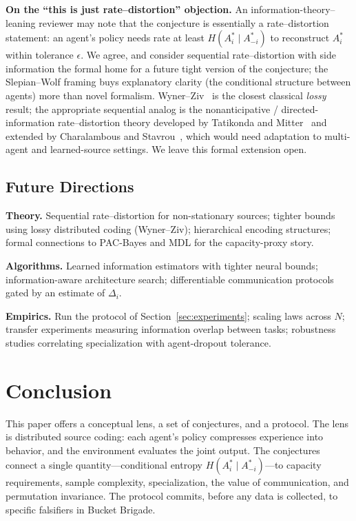 \documentclass[10pt, letterpaper]{article}
\begin{document}
\textbf{On the ``this is just rate--distortion'' objection.} An information-theory--leaning reviewer may note that the conjecture is essentially a rate--distortion statement: an agent's policy needs rate at least $H(A_i^*\mid A_{-i}^*)$ to reconstruct $A_i^*$ within tolerance $\epsilon$. We agree, and consider sequential rate--distortion with side information the formal home for a future tight version of the conjecture; the Slepian--Wolf framing buys explanatory clarity (the conditional structure between agents) more than novel formalism. Wyner--Ziv~\cite{wyner1976} is the closest classical \emph{lossy} result; the appropriate sequential analog is the nonanticipative / directed-information rate--distortion theory developed by Tatikonda and Mitter~\cite{tatikonda2004} and extended by Charalambous and Stavrou~\cite{charalambous2017}, which would need adaptation to multi-agent and learned-source settings. We leave this formal extension open.

\subsection{Future Directions}

\textbf{Theory.} Sequential rate--distortion for non-stationary sources; tighter bounds using lossy distributed coding (Wyner--Ziv); hierarchical encoding structures; formal connections to PAC-Bayes and MDL for the capacity-proxy story.

\textbf{Algorithms.} Learned information estimators with tighter neural bounds; information-aware architecture search; differentiable communication protocols gated by an estimate of $\Delta_i$.

\textbf{Empirics.} Run the protocol of Section~\ref{sec:experiments}; scaling laws across $N$; transfer experiments measuring information overlap between tasks; robustness studies correlating specialization with agent-dropout tolerance.

\section{Conclusion}
\label{sec:conclusion}

This paper offers a conceptual lens, a set of conjectures, and a protocol. The lens is distributed source coding: each agent's policy compresses experience into behavior, and the environment evaluates the joint output. The conjectures connect a single quantity---conditional entropy $H(A_i^*\mid A_{-i}^*)$---to capacity requirements, sample complexity, specialization, the value of communication, and permutation invariance. The protocol commits, before any data is collected, to specific falsifiers in Bucket Brigade.
\end{document}
